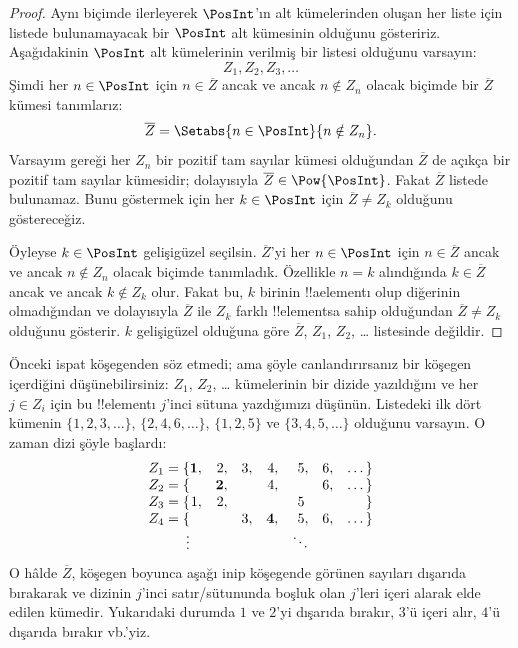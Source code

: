 \documentclass[../../../include/open-logic-section]{subfiles}
\begin{document}
\begin{proof}
Aynı biçimde ilerleyerek $\PosInt$'ın alt kümelerinden oluşan her liste için listede
bulunamayacak bir $\PosInt$ alt kümesinin olduğunu gösteririz. Aşağıdakinin
$\PosInt$ alt kümelerinin verilmiş bir listesi olduğunu varsayın:
\[
Z_{1}, Z_{2}, Z_{3}, \dots
\]
Şimdi her $n\in\PosInt$ için $n\in\overline{Z}$ ancak ve ancak $n\notin Z_n$
olacak biçimde bir $\overline{Z}$ kümesi tanımlarız:
\[
\overline{Z} = \Setabs{n \in \PosInt}{n \notin Z_n}.
\]
Varsayım gereği her $Z_n$ bir pozitif tam sayılar kümesi olduğundan
$\overline{Z}$ de açıkça bir pozitif tam sayılar kümesidir; dolayısıyla
$\overline{Z}\in\Pow{\PosInt}$. Fakat $\overline{Z}$ listede bulunamaz.
Bunu göstermek için her $k\in\PosInt$ için $\overline{Z}\neq Z_k$ olduğunu
göstereceğiz.

Öyleyse $k\in\PosInt$ gelişigüzel seçilsin. $\overline{Z}$'yi her
$n\in\PosInt$ için $n\in\overline{Z}$ ancak ve ancak $n\notin Z_n$ olacak
biçimde tanımladık. Özellikle $n=k$ alındığında $k\in\overline{Z}$ ancak ve
ancak $k\notin Z_k$ olur. Fakat bu, $k$ birinin !!a{element}{}ı olup diğerinin
olmadığından ve dolayısıyla $\overline{Z}$ ile $Z_k$ farklı !!{element}s{}a
sahip olduğundan $\overline{Z}\neq Z_k$ olduğunu gösterir. $k$ gelişigüzel
olduğuna göre $\overline{Z}$, $Z_1$, $Z_2$, \dots{} listesinde değildir.
\end{proof}

\begin{explain}
Önceki ispat köşegenden söz etmedi; ama şöyle canlandırırsanız bir köşegen
içerdiğini düşünebilirsiniz: $Z_1$, $Z_2$, \dots{} kümelerinin bir dizide
yazıldığını ve her $j\in Z_i$ için bu !!{element}{}ı $j$'inci sütuna yazdığımızı
düşünün. Listedeki ilk dört kümenin $\{1,2,3,\dots\}$, $\{2,4,6,\dots\}$,
$\{1,2,5\}$ ve $\{3,4,5,\dots\}$ olduğunu varsayın. O zaman dizi şöyle
başlardı:
\[
\begin{array}{r@{}rrrrrrr}
  Z_1 = \{ & \mathbf{1}, & 2, & 3, & 4, & 5, & 6, & \dots\}\\
  Z_2 = \{ &  & \mathbf{2}, &  & 4, &  & 6, & \dots\}\\
  Z_3 = \{ & 1, & 2, &  &  & 5\phantom{,} &  & \}\\
  Z_4 = \{ &  &  & 3, & \mathbf{4}, & 5, & 6, & \dots\}\\
  \vdots & & & & & \ddots
\end{array}
\]
O hâlde $\overline{Z}$, köşegen boyunca aşağı inip köşegende görünen
sayıları dışarıda bırakarak ve dizinin $j$'inci satır/sütununda boşluk olan
$j$'leri içeri alarak elde edilen kümedir. Yukarıdaki durumda $1$ ve $2$'yi
dışarıda bırakır, $3$'ü içeri alır, $4$'ü dışarıda bırakır vb.'yiz.
\end{explain}
\end{document}
